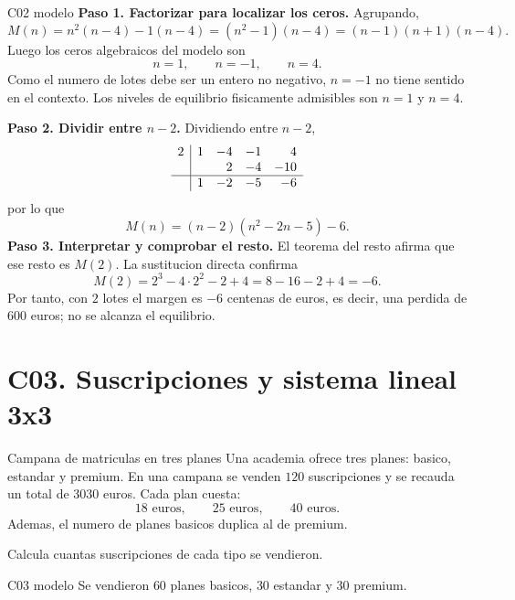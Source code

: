\begin{fullsolution}{C02 modelo}
\textbf{Paso 1. Factorizar para localizar los ceros.}
Agrupando,
\[
M(n)=n^2(n-4)-1(n-4)=(n^2-1)(n-4)=(n-1)(n+1)(n-4).
\]
Luego los ceros algebraicos del modelo son
\[
n=1,\qquad n=-1,\qquad n=4.
\]
Como el numero de lotes debe ser un entero no negativo, \(n=-1\) no tiene sentido en el
contexto. Los niveles de equilibrio fisicamente admisibles son \(n=1\) y \(n=4\).

\textbf{Paso 2. Dividir entre \(n-2\).}
Dividiendo entre \(n-2\),
\[
\begin{array}{r|rrrr}
2 & 1 & -4 & -1 & 4\\
  &   & 2 & -4 & -10\\
\hline
  & 1 & -2 & -5 & -6
\end{array}
\]
por lo que
\[
M(n)=(n-2)(n^2-2n-5)-6.
\]
\textbf{Paso 3. Interpretar y comprobar el resto.} El teorema del resto afirma que ese resto es
\(M(2)\). La sustitucion directa confirma
\[
M(2)=2^3-4\cdot2^2-2+4=8-16-2+4=-6.
\]
Por tanto, con \(2\) lotes el margen es \(-6\) centenas de euros, es decir, una perdida de
\(600\) euros; no se alcanza el equilibrio.
\end{fullsolution}

\section{C03. Suscripciones y sistema lineal 3x3}

\begin{contextproblem}{Campana de matriculas en tres planes}
Una academia ofrece tres planes: basico, estandar y premium. En una campana se venden
\(120\) suscripciones y se recauda un total de \(3030\) euros. Cada plan cuesta:
\[
18\text{ euros},\qquad 25\text{ euros},\qquad 40\text{ euros}.
\]
Ademas, el numero de planes basicos duplica al de premium.

Calcula cuantas suscripciones de cada tipo se vendieron.
\end{contextproblem}

\begin{shortanswer}{C03 modelo}
Se vendieron \(60\) planes basicos, \(30\) estandar y \(30\) premium.
\end{shortanswer}

